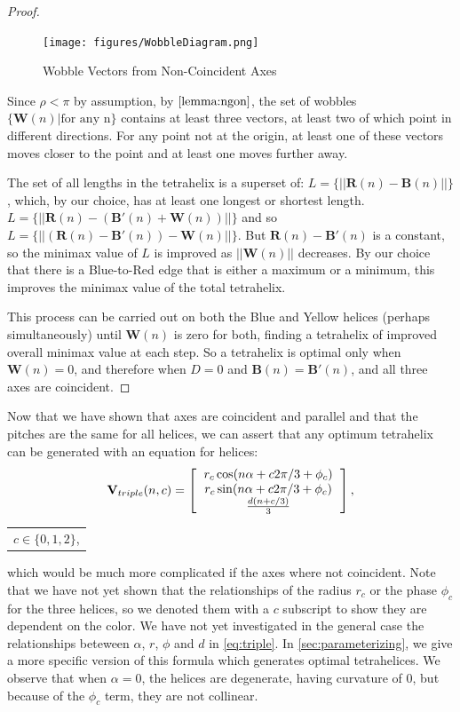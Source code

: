 \documentclass[twocolumn,10pt]{asme2ej}
\renewcommand{\vec}[1]{\mathbf{#1}}
\begin{document}
\begin{proof}
  \begin{figure}
     \centering
     \texttt{[image: figures/WobbleDiagram.png]}
     \caption{Wobble Vectors from Non-Coincident Axes}
  \label{fig:wobble}
\end{figure}

  Since $\rho < \pi$ by assumption, by $\cref{lemma:ngon}$,
  the set of wobbles $\{\vec{W}(n) | \text{for any n}\}$
  contains at least three vectors,
  at least two of which point in different directions.
  For any point not at the origin, at least one of these vectors moves closer to the
  point and at least one moves further away.

    The set of all lengths in the tetrahelix is a superset of:
    $L = \{|| \vec{R}(n) - \vec{B}(n)||\}$, which, by our choice,
    has at least one longest or shortest
    length.
    $L = \{|| \vec{R}(n) - (\vec{B'}(n) + \vec{W}(n))||\}$ and so
    $L = \{|| (\vec{R}(n) - \vec{B'}(n)) - \vec{W}(n)||\}$.
    But $\vec{R}(n) - \vec{B'}(n)$ is a constant, so the minimax value of $L$ is improved as $||\vec{W}(n)||$
    decreases.  
    By our choice that there is a Blue-to-Red edge that is either a maximum or a minimum,
    this improves the minimax value of the total tetrahelix.
    
    This process can be carried out on both the Blue and Yellow helices
    (perhaps simultaneously) until $\vec{W}(n)$ is
    zero for both, finding a tetrahelix of improved overall minimax value at each step.
    So a tetrahelix is optimal only when $\vec{W}(n) = 0$, and therefore when $D=0$ and
    $\vec{B}(n) = \vec{B'}(n)$, and all three axes are coincident.
\end{proof}

Now that we have shown that axes are coincident and parallel and that the pitches
are the same for all helices, we can assert that any optimum tetrahelix can
be generated with an equation for helices:
\begin{equation}
\label{eq:triple}
\vec{V}_{triple}(n,c) =
\left [
  \begin{tabular}{c}
   $ r_c \cos(n \alpha +  c 2 \pi /3 + \phi_c)$\\
   $ r_c \sin(n \alpha +  c 2 \pi /3 + \phi_c) $\\
   $ \frac{d(n +c / 3)}{3}   $
  \end{tabular}
  \right ],
\end{equation}
\begin{tabular}{l}
  $c \in \{0,1,2\}$,
  \end{tabular}      
which would be much more complicated if the axes where not coincident.
Note that we have not yet shown that the relationships of the radius $r_c$ or
the phase $\phi_c$ for the three helices, so we denoted them with a $c$ subscript to show
they are dependent on the color.
We have not yet investigated in the general case the relationships beteween
$\alpha$, $r$, $\phi$ and $d$ in \cref{eq:triple}.
In \cref{sec:parameterizing}, we give a more specific version of this formula which
generates optimal tetrahelices.
We observe that when $\alpha = 0$, the helices are degenerate, having curvature of $0$,
but because of the $\phi_c$ term, they are not collinear.
\end{document}
